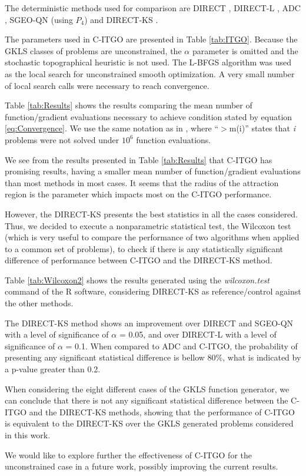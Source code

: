 The deterministic methods used for comparison are DIRECT \citep{DIRECT}, DIRECT-L \citep{DIRECTL}, ADC \citep{ADC}, SGEO-QN \citep{SGEO} (using $P_4$) and DIRECT-KS \citep{ADC2}. 

The parameters used in C-ITGO are presented in Table \ref{tab:ITGO}. Because the GKLS classes of problems are unconstrained, the $\alpha$ parameter is omitted and the stochastic topographical heuristic is not used. The L-BFGS algorithm was used as the local search for unconstrained smooth optimization. A very small number of local search calls were necessary to reach convergence.



Table \ref{tab:Results} shows the results comparing the mean number of function/gradient evaluations necessary to achieve condition stated by equation \ref{eq:Convergence}. We use the same notation as in \cite{NAT}, where “$>$m(i)” states that \textit{i} problems were not solved under $10^6$ function evaluations.




We see from the results presented in Table \ref{tab:Results} that C-ITGO has promising results, having a smaller mean number of function/gradient evaluations than most methods in most cases. It seems that the radius of the attraction region is the parameter which impacts most on the C-ITGO performance.

However, the DIRECT-KS presents the best statistics in all the cases considered. Thus, we decided to execute a nonparametric statistical test, the Wilcoxon test \citep{Friedman} (which is very useful to compare the performance of two algorithms when applied to a common set of problems), to check if there is any statistically significant difference of performance between C-ITGO and the DIRECT-KS method.

Table \ref{tab:Wilcoxon2} shows the results generated using the \textit{wilcoxon.test} command of the R software, considering DIRECT-KS as reference/control against the other methods. 



The DIRECT-KS method shows an improvement over DIRECT and SGEO-QN with a level of significance of $\alpha$ = 0.05, and over DIRECT-L with a level of significance of $\alpha$ = 0.1. When compared to ADC and C-ITGO, the probability of presenting any significant statistical difference is bellow 80\%, what is indicated by a p-value greater than 0.2. 

When considering the eight different cases of the GKLS function generator, we can conclude that there is not any significant statistical difference between the C-ITGO and the DIRECT-KS methods, showing that the performance of C-ITGO is equivalent to the DIRECT-KS over the GKLS generated problems considered in this work.

We would like to explore further the effectiveness of C-ITGO for the unconstrained case in a future work, possibly improving the current results.